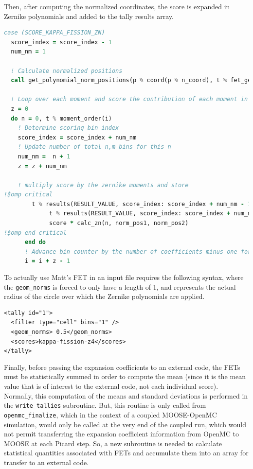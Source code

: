 \documentclass[10pt]{article}
\numberwithin{equation}{section} %
\begin{document}
Then, after computing the normalized coordinates, the score is expanded in Zernike polynomials and added to the tally results array.
			
\begin{lstlisting}[language=Fortran]
case (SCORE_KAPPA_FISSION_ZN)
  score_index = score_index - 1
  num_nm = 1

  ! Calculate normalized positions
  call get_polynomial_norm_positions(p % coord(p % n_coord), t % fet_geom_norm, norm_pos1, norm_pos2, SCORE_KAPPA_FISSION_ZN)
      
  ! Loop over each moment and score the contribution of each moment in the appropriate bin
  z = 0
  do n = 0, t % moment_order(i)
    ! Determine scoring bin index
    score_index = score_index + num_nm
    ! Update number of total n,m bins for this n
    num_nm =  n + 1
    z = z + num_nm
    
    ! multiply score by the zernike moments and store
!$omp critical
        t % results(RESULT_VALUE, score_index: score_index + num_nm - 1, filter_index) = &
             t % results(RESULT_VALUE, score_index: score_index + num_nm - 1, filter_index) + &
             score * calc_zn(n, norm_pos1, norm_pos2)
!$omp end critical
      end do
      ! Advance bin counter by the number of coefficients minus one for later update
      i = i + z - 1
\end{lstlisting}

To actually use Matt's FET in an input file requires the following syntax, where the {\tt geom\_norms} is forced to only have a length of 1, and represents the actual radius of the circle over which the Zernike polynomials are applied.

\begin{lstlisting}
<tally id="1">
  <filter type="cell" bins="1" />
  <geom_norms> 0.5</geom_norms>
  <scores>kappa-fission-z4</scores>
</tally>
\end{lstlisting}

Finally, before passing the expansion coefficients to an external code, the FETs must be statistically summed in order to compute the mean (since it is the mean value that is of interest to the external code, not each individual score). Normally, this computation of the means and standard deviations is performed in the {\tt write\_tallies} subroutine. But, this routine is only called from {\tt openmc\_finalize}, which in the context of a coupled MOOSE-OpenMC simulation, would only be called at the very end of the coupled run, which would not permit transferring the expansion coefficient information from OpenMC to MOOSE at each Picard step. So, a new subroutine is needed to calculate statistical quantities associated with FETs and accumulate them into an array for transfer to an external code.
\end{document}
